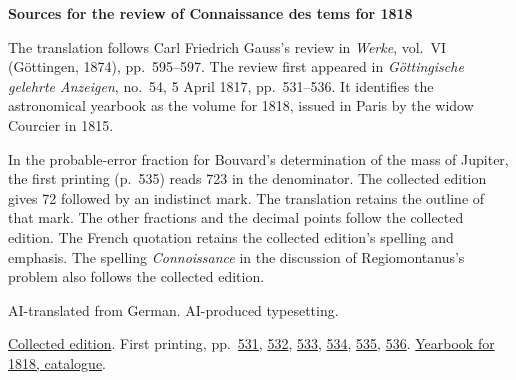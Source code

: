 \clearpage\thispagestyle{empty}
\begin{center}\Large\bfseries Sources for the review of Connaissance des tems for 1818\end{center}

The translation follows Carl Friedrich Gauss’s review in \emph{Werke}, vol.~VI (Göttingen, 1874), pp.~595--597. The review first appeared in \emph{Göttingische gelehrte Anzeigen}, no.~54, 5 April 1817, pp.~531--536. It identifies the astronomical yearbook as the volume for 1818, issued in Paris by the widow Courcier in 1815.

In the probable-error fraction for Bouvard’s determination of the mass of Jupiter, the first printing (p.~535) reads 723 in the denominator. The collected edition gives 72 followed by an indistinct mark. The translation retains the outline of that mark. The other fractions and the decimal points follow the collected edition. The French quotation retains the collected edition’s spelling and emphasis. The spelling \emph{Connoissance} in the discussion of Regiomontanus’s problem also follows the collected edition.

AI-translated from German. AI-produced typesetting.

\href{https://gdz.sub.uni-goettingen.de/id/PPN236007467}{Collected edition}. First printing, pp.~\href{https://images.p.sub.uni-goettingen.de/iiif/image/gdz:PPN319721507_1817:00000541/full/1650,/0/default.jpg}{531}, \href{https://images.p.sub.uni-goettingen.de/iiif/image/gdz:PPN319721507_1817:00000542/full/1650,/0/default.jpg}{532}, \href{https://images.p.sub.uni-goettingen.de/iiif/image/gdz:PPN319721507_1817:00000543/full/1650,/0/default.jpg}{533}, \href{https://images.p.sub.uni-goettingen.de/iiif/image/gdz:PPN319721507_1817:00000544/full/1650,/0/default.jpg}{534}, \href{https://images.p.sub.uni-goettingen.de/iiif/image/gdz:PPN319721507_1817:00000545/full/1650,/0/default.jpg}{535}, \href{https://images.p.sub.uni-goettingen.de/iiif/image/gdz:PPN319721507_1817:00000546/full/1650,/0/default.jpg}{536}. \href{https://cdt.imcce.fr/items/show/167}{Yearbook for 1818, catalogue}.

\clearpage
